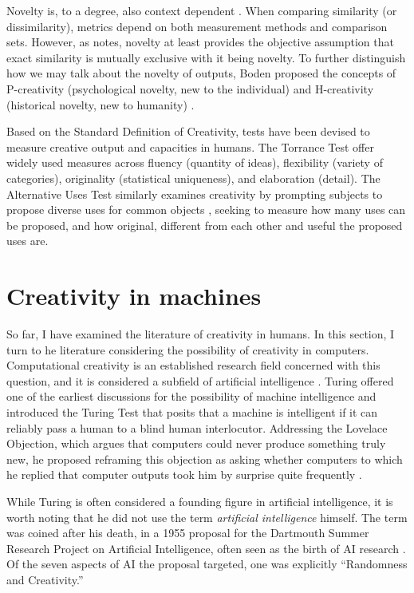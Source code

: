 Novelty is, to a degree, also context dependent . When comparing similarity (or dissimilarity), metrics depend on both measurement methods and comparison sets. However, as \cite{Bown2021-os} notes, novelty at least provides the objective assumption that exact similarity is mutually exclusive with it being novelty. To further distinguish how we may talk about the novelty of outputs, Boden proposed the concepts of P-creativity (psychological novelty, new to the individual) and H-creativity (historical novelty, new to humanity) \cite{Boden2003-hk}.

Based on the Standard Definition of Creativity, tests have been devised to measure creative output and capacities in humans. The Torrance Test \cite{Torrance1972-br} offer widely used measures across fluency (quantity of ideas), flexibility (variety of categories), originality (statistical uniqueness), and elaboration (detail). The Alternative Uses Test similarly examines creativity by prompting subjects to propose diverse uses for common objects \cite{Runco2012-np, Guilford1967-py}, seeking to measure how many uses can be proposed, and how original, different from each other and useful the proposed uses are. 

\section{Creativity in machines}

So far, I have examined the literature of creativity in humans. In this section, I turn to he literature considering the possibility of creativity in computers. Computational creativity is an established research field concerned with this question, and it is considered a subfield of artificial intelligence \cite{Colton2021-bt}. 
Turing offered one of the earliest discussions for the possibility of machine intelligence and introduced the Turing Test that posits that a machine is intelligent if it can reliably pass a human to a blind human interlocutor. Addressing the Lovelace Objection, which argues that computers could never produce something truly new, he proposed reframing this objection as asking whether computers to which he replied that computer outputs took him by surprise quite frequently \cite{Turing1950-aq}. 

While Turing is often considered a founding figure in artificial intelligence, it is worth noting that he did not use the term \emph{artificial intelligence} himself. The term was coined after his death, in a 1955 proposal for the Dartmouth Summer Research Project on Artificial Intelligence, often seen as the birth of AI research \cite{McCarthy1955-ls}. Of the seven aspects of AI the proposal targeted, one was explicitly “Randomness and Creativity.” 


